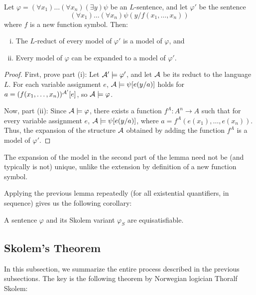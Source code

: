 \begin{lemma}\label{lemma:skolem-variant-conservative-extension}
Let $\varphi=(\forall x_1)\dots(\forall x_n)(\exists y)\psi$ be an $L$-sentence, and let $\varphi'$ be the sentence 
$$
(\forall x_1)\dots(\forall x_n)\psi(y/f(x_1,\dots,x_n))$$
where $f$ is a new function symbol. Then:
\begin{enumerate}[(i)]
    \item The $L$-reduct of every model of $\varphi'$ is a model of $\varphi$, and 
    \item Every model of $\varphi$ can be expanded to a model of $\varphi'$.
\end{enumerate}
\end{lemma}

\begin{proof}
    First, prove part (i): Let $\mathcal{A}'\models\varphi'$, and let $\mathcal{A}$ be its reduct to the language $L$. For each variable assignment $e$, $\mathcal{A}\models\psi[e(y/a)]$ holds for $a=(f(x_1,\dots,x_n))^{\mathcal{A}'}[e]$, so $\mathcal{A}\models\varphi$.
    
    Now, part (ii): Since $\mathcal{A}\models\varphi$, there exists a function $f^A:A^n\to A$ such that for every variable assignment $e$, $\mathcal{A}\models \psi[e(y/a)]$, where $a=f^A(e(x_1),\dots,e(x_n))$. Thus, the expansion of the structure $\mathcal{A}$ obtained by adding the function $f^A$ is a model of $\varphi'$.    
\end{proof}

\begin{remark}
    The expansion of the model in the second part of the lemma need not be (and typically is not) unique, unlike the extension by definition of a new function symbol.
\end{remark}

Applying the previous lemma repeatedly (for all existential quantifiers, in sequence) gives us the following corollary:

\begin{corollary}
    A sentence $\varphi$ and its Skolem variant $\varphi_S$ are equisatisfiable.
\end{corollary}

\subsection{Skolem's Theorem}

In this subsection, we summarize the entire process described in the previous subsections. The key is the following theorem by Norwegian logician Thoralf Skolem:

